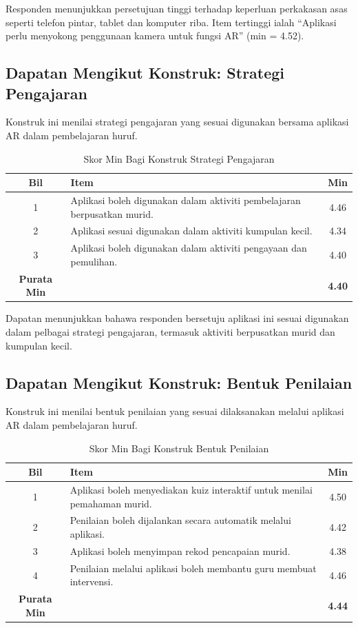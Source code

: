 {{Responden menunjukkan persetujuan tinggi terhadap keperluan perkakasan asas seperti telefon pintar, tablet dan komputer riba. Item tertinggi ialah “Aplikasi perlu menyokong penggunaan kamera untuk fungsi AR” (min = 4.52).
\subsection{Dapatan Mengikut Konstruk: Strategi Pengajaran}

Konstruk ini menilai strategi pengajaran yang sesuai digunakan bersama aplikasi AR dalam pembelajaran huruf.

\begin{table}[H]
\centering
\caption{Skor Min Bagi Konstruk Strategi Pengajaran}
\label{jadual:strategiPengajaran}
\begin{tabular}{|c|p{9cm}|c|}
\hline
\textbf{Bil} & \textbf{Item} & \textbf{Min} \\
\hline
1 & Aplikasi boleh digunakan dalam aktiviti pembelajaran berpusatkan murid. & 4.46 \\
\hline
2 & Aplikasi sesuai digunakan dalam aktiviti kumpulan kecil. & 4.34 \\
\hline
3 & Aplikasi boleh digunakan dalam aktiviti pengayaan dan pemulihan. & 4.40 \\
\hline
\textbf{Purata Min} & & \textbf{4.40} \\
\hline
\end{tabular}
\end{table}

Dapatan menunjukkan bahawa responden bersetuju aplikasi ini sesuai digunakan dalam pelbagai strategi pengajaran, termasuk aktiviti berpusatkan murid dan kumpulan kecil.
\subsection{Dapatan Mengikut Konstruk: Bentuk Penilaian}

Konstruk ini menilai bentuk penilaian yang sesuai dilaksanakan melalui aplikasi AR dalam pembelajaran huruf.

\begin{table}[H]
\centering
\caption{Skor Min Bagi Konstruk Bentuk Penilaian}
\label{jadual:bentukPenilaian}
\begin{tabular}{|c|p{9cm}|c|}
\hline
\textbf{Bil} & \textbf{Item} & \textbf{Min} \\
\hline
1 & Aplikasi boleh menyediakan kuiz interaktif untuk menilai pemahaman murid. & 4.50 \\
\hline
2 & Penilaian boleh dijalankan secara automatik melalui aplikasi. & 4.42 \\
\hline
3 & Aplikasi boleh menyimpan rekod pencapaian murid. & 4.38 \\
\hline
4 & Penilaian melalui aplikasi boleh membantu guru membuat intervensi. & 4.46 \\
\hline
\textbf{Purata Min} & & \textbf{4.44} \\
\hline
\end{tabular}
\end{table}

}}
